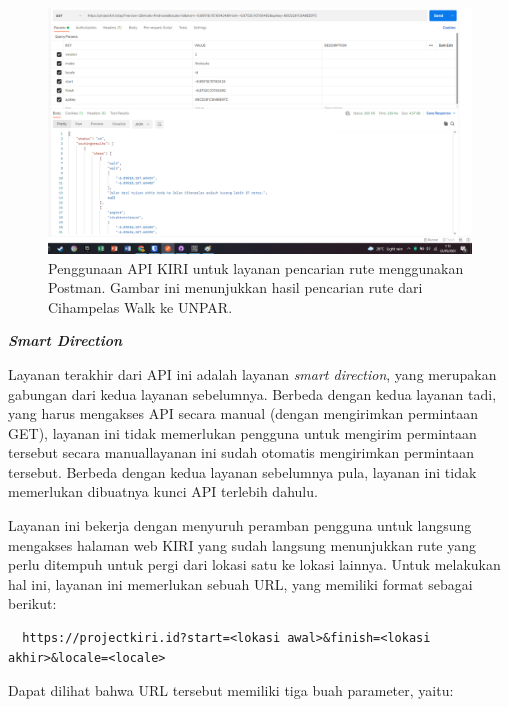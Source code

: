 \documentclass[a4paper,twoside]{article}
\begin{document}
\begin{enumerate}
\begin{figure}[t]
    \centering
    \includegraphics[width=0.74\linewidth]{apikiri-routing}
    \caption[Penggunaan API KIRI untuk layanan pencarian rute]{Penggunaan API KIRI untuk layanan pencarian rute menggunakan Postman. Gambar ini menunjukkan hasil pencarian rute dari Cihampelas Walk ke UNPAR.}
    \label{fig:kiri-api-routing-usage}
\end{figure}

\vspace{\baselineskip}
\textbf{\textit{\large{Smart Direction}}}
\label{sec:kiri-api-smartdir}

Layanan terakhir dari API ini adalah layanan \textit{smart direction}, yang merupakan gabungan dari kedua layanan sebelumnya. Berbeda dengan kedua layanan tadi, yang harus mengakses API secara manual (dengan mengirimkan permintaan GET), layanan ini tidak memerlukan pengguna untuk mengirim permintaan tersebut secara manual\textemdash layanan ini sudah otomatis mengirimkan permintaan tersebut. Berbeda dengan kedua layanan sebelumnya pula, layanan ini tidak memerlukan dibuatnya kunci API terlebih dahulu.

Layanan ini bekerja dengan menyuruh peramban pengguna untuk langsung mengakses halaman web KIRI yang sudah langsung menunjukkan rute yang perlu ditempuh untuk pergi dari lokasi satu ke lokasi lainnya. Untuk melakukan hal ini, layanan ini memerlukan sebuah URL, yang memiliki format sebagai berikut:

\begin{verbatim}
  https://projectkiri.id?start=<lokasi awal>&finish=<lokasi akhir>&locale=<locale>
\end{verbatim}
\noindent
Dapat dilihat bahwa URL tersebut memiliki tiga buah parameter, yaitu:


\end{enumerate}
\end{document}
